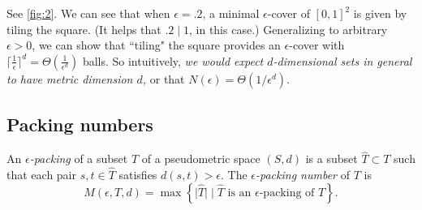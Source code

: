 \documentclass[11pt]{article}
\begin{document}
See \cref{fig:2}. We can see that when $\epsilon = .2$, a minimal $\epsilon$-cover of $[0,1]^2$ is
given by tiling the square. (It helps that $.2 \mid 1$, in this case.) 
Generalizing to arbitrary $\epsilon > 0$, we can show that
``tiling" the square provides an $\epsilon$-cover with $\lceil \frac{1}{\epsilon}
\rceil^d = \Theta\left(\frac{1}{\epsilon^d}\right)$ 
balls.
So intuitively, \emph{we would expect $d$-dimensional sets in general to have metric dimension $d$,}
or that $N(\epsilon) = \Theta(1/\epsilon^d)$.


\subsection{Packing numbers}
\begin{definition}
  An \emph{$\epsilon$-packing} of a subset $T$ of a pseudometric space $(S,d)$ is a subset 
  $\widehat{T} \subset T$ such that each pair $s,t \in \widehat{T}$ satisfies
  $d(s,t) > \epsilon$. The \emph{$\epsilon$-packing number} of $T$ is 
  $$
  M(\epsilon, T, d) = \max\left\{
    \big|\widehat{T}\big| \mid \widehat{T} \text{ is an }\epsilon\text{-packing of }T 
  \right\}.
  $$
\end{definition}
\end{document}

